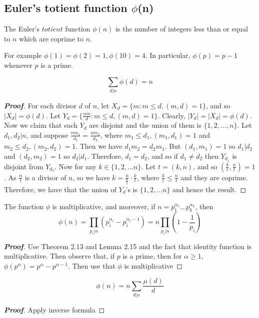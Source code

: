 \subsection{Euler's totient function $\phi$(n)}
\begin{definition} The Euler's $totient$ function $\phi(n)$ is the number of integers less than or equal to $n$ which are coprime to $n$.
\end{definition}
For example $\phi(1)=\phi(2)=1, \phi(10)=4$. In particular, $\phi(p)=p-1$ whenever $p$ is a prime.
\begin{lemma} \begin{equation*} \sum_{d|n}\phi(d)=n \end{equation*}
\end{lemma}
\begin{proof}[\bf Proof] For each divisor $d$ of $n$, let $X_d=\{m: m \le d, (m,d)=1\}$, and so $|X_d|=\phi(d)$. Let $Y_d=\{\frac{nm}{d}: m \le d, (m,d)=1\}$. Clearly, $|Y_d| = |X_d| =\phi(d)$. Now we claim that each $Y_d$ are disjoint and the union of them is $\{1,2,\ldots,n\}$. Let $d_1,d_2|n$, and suppose $\frac{nm_1}{d_1}=\frac{nm_2}{d_2}$, where $m_1 \le d_1, (m_1,d_1)=1$ and $m_2 \le d_2, (m_2,d_2)=1$. Then we have $d_1 m_2 =d_2 m_1$. But $(d_1,m_1)=1$ so $d_1 | d_2$ and $(d_2,m_2)=1$ so $d_2 | d_1$. Therefore, $d_1=d_2$, and so if $d_1 \neq d_2$ then $Y_{d_1}$ is disjoint from $Y_{d_2}$. Now for any $k \in \{1,2,\ldots n\}$. Let $t=(k,n)$, and so $(\frac{k}{t},\frac{n}{t})=1$. As $\frac{n}{t}$ is a divisor of $n$, so we have $k=\frac{n}{\frac{n}{t}} \cdot \frac{k}{t}$, where $\frac{k}{t} \le \frac{n}{t}$ and they are coprime. Therefore, we have that the union of $Y_d$'s is $\{1,2,\ldots n\}$ and hence the result.
\end{proof}
\begin{theorem} The function $\phi$ is multiplicative, and moreover, if $n=p_1^{\alpha_1} \ldots p_k^{\alpha_k}$, then
\begin{equation*} \phi(n)=\prod_{p_i|n}\left(p_i^{\alpha_i} - p_i^{\alpha_i -1}\right)=n \prod_{p_i|n}(1-\frac{1}{p_i}) \end{equation*}
\end{theorem}
\begin{proof}[\bf Proof] Use Theorem 2.13 and Lemma 2.15 and the fact that identity function is multiplicative. Then observe that, if $p$ is a prime, then for $\alpha \ge 1$, $\phi(p^\alpha)=p^\alpha-p^{\alpha-1}$. Then use that $\phi$ is multiplicative
\end{proof}
\begin{lemma} \begin{equation*} \phi(n)=n \sum_{d|n}\frac{\mu(d)}{d} \end{equation*}
\end{lemma}
\begin{proof}[\bf Proof] Apply inverse formula
\end{proof}

